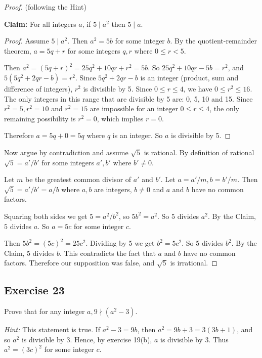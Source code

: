 \documentclass[14pt]{extarticle}
\begin{document}
\begin{proof}
    (following the Hint)

    {\bf Claim:} For all integers $a$, if $5 \mid a^2$ then $5 \mid a$.

    \begin{proof}
        Assume $5 \mid a^2$. Then $a^2 = 5b$ for some integer $b$. By the quotient-remainder theorem, $a = 5q+r$ for some integers $q,r$ where $0 \leq r < 5$.

        Then $a^2 = (5q+r)^2 = 25q^2 + 10qr + r^2 = 5b$. So $25q^2 + 10qr - 5b = r^2$, and $5(5q^2 + 2qr - b) = r^2$. Since $5q^2 + 2qr - b$ is an integer (product, sum and difference of integers), $r^2$ is divisible by 5. Since $0 \leq r \leq 4$, we have $0 \leq r^2 \leq 16$. The only integers in this range that are divisible by 5 are: 0, 5, 10 and 15. Since $r^2 = 5, r^2 = 10$ and $r^2 = 15$ are impossible for an integer $0 \leq r \leq 4$, the only remaining possibility is $r^2 = 0$, which implies $r = 0$.

        Therefore $a = 5q + 0 = 5q$ where $q$ is an integer. So $a$ is divisible by 5.
    \end{proof}

    Now argue by contradiction and assume $\sqrt{5}$ is rational. By definition of rational $\sqrt{5} = a'/b'$ for some integers $a', b'$ where $b' \neq 0$.

    Let $m$ be the greatest common divisor of $a'$ and $b'$. Let $a = a'/m, b = b'/m$. Then $\sqrt{5} = a'/b' = a/b$ where $a,b$ are integers, $b \neq 0$ and $a$ and $b$ have no common factors.

    Squaring both sides we get $5 = a^2 / b^2$, so $5b^2 = a^2$. So $5$ divides $a^2$. By the Claim, $5$ divides $a$. So $a = 5c$ for some integer $c$.

    Then $5b^2 = (5c)^2 = 25c^2$. Dividing by 5 we get $b^2 = 5c^2$. So 5 divides $b^2$. By the Claim, 5 divides $b$. This contradicts the fact that $a$ and $b$ have no common factors. Therefore our supposition was false, and $\sqrt{5}$ is irrational.
\end{proof}

\subsection{Exercise 23}
Prove that for any integer $a, 9 \nmid (a^2 - 3).$

{\it Hint:} This statement is true. If $a^2 - 3 = 9b$, then
$a^2 = 9b + 3 = 3(3b + 1)$, and so $a^2$ is divisible by 3.
Hence, by exercise 19(b), $a$ is divisible by 3. Thus
$a^2 = (3c)^2$ for some integer $c$.
\end{document}
